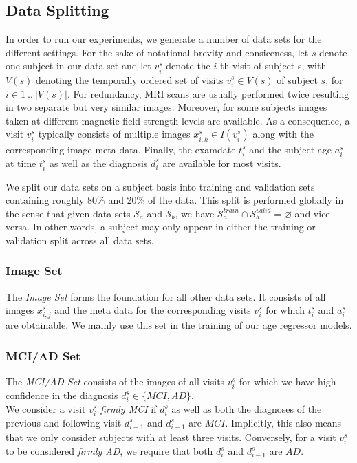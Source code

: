 \subsection{Data Splitting} \label{sec:dat}
In order to run our experiments, we generate a number of data sets for the different settings. For the sake of notational brevity and consiceness, let $s$ denote one subject in our data set and let $v^s_i$ denote the $i$-th visit of subject s, with $V(s)$ denoting the temporally ordered set of visits $v^s_i \in V(s)$ of subject $s$, for $i \in 1 \ ..\ |V(s)|$. For redundancy, MRI scans are usually performed twice resulting in two separate but very similar images. Moreover, for some subjects images taken at different magnetic field strength levels are available. As a consequence, a visit $v^s_i$ typically consists of multiple images $x^s_{i, k} \in I(v^s_i)$ along with the corresponding image meta data. Finally, the examdate $t^s_i$ and the subject age $a^s_i$ at time $t^s_i$ as well as the diagnosis $d^s_i$ are available for most visits.

We split our data sets on a subject basis into training and validation sets containing roughly 80\% and 20\% of the data. This split is performed globally in the sense that given data sets $\mathcal{S}_a$ and $\mathcal{S}_b$, we have $\mathcal{S}_a^{train} \cap \mathcal{S}_b^{valid} = \varnothing$ and vice versa. In other words, a subject may only appear in either the training or validation split across all data sets.

\subsubsection*{Image Set} \label{sec:datsingles}
The \textit{Image Set} forms the foundation for all other data sets. It consists of all images $x^s_{i, j}$ and the meta data for the corresponding visits $v^s_i$ for which $t^s_i$ and $a^s_i$ are obtainable. We mainly use this set in the training of our age regressor models.

\subsubsection*{MCI/AD Set} \label{sec:datmciad}
The \textit{MCI/AD Set} consists of the images of all visits $v^s_i$ for which we have high confidence in the diagnosis $d^s_i \in \{MCI, AD\}$. \\
We consider a visit $v^s_i$ \textit{firmly MCI} if $d^s_i$ as well as both the diagnoses of the previous and following visit $d^s_{i-1}$ and $d^s_{i+1}$ are $MCI$. Implicitly, this also means that we only consider subjects with at least three visits. Conversely, for a visit $v^s_i$ to be considered \textit{firmly AD}, we require that both $d^s_i$ and $d^s_{i-1}$ are $AD$.

